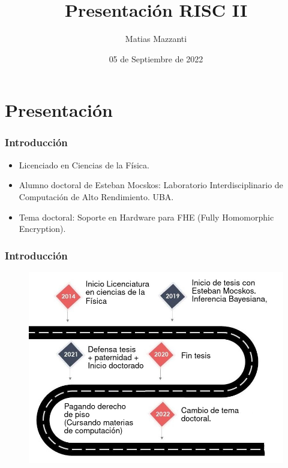 \documentclass[10pt]{beamer}
\title[RISC II]{Presentación RISC II}
\author[Matias Mazzanti]{Matias Mazzanti}
\institute{DC-UBA}
\date{05 de Septiembre de 2022}
\begin{document}
\begin{frame}

\maketitle

\end{frame}


\section{Presentaci\'on}
\begin{frame}
\frametitle{Introducción}

\begin{itemize}
  \item Licenciado en Ciencias de la Física.
  \item Alumno doctoral de Esteban Mocskos: Laboratorio Interdisciplinario de Computación de Alto Rendimiento. UBA.
  \item Tema doctoral: Soporte en Hardware para FHE (Fully Homomorphic Encryption).
\end{itemize}

\end{frame}



\begin{frame}
\frametitle{Introducción}
\begin{figure}[h!]
    \centering
    \includegraphics[scale=0.3]{road.jpg}
\end{figure}
\end{frame}
\end{document}
